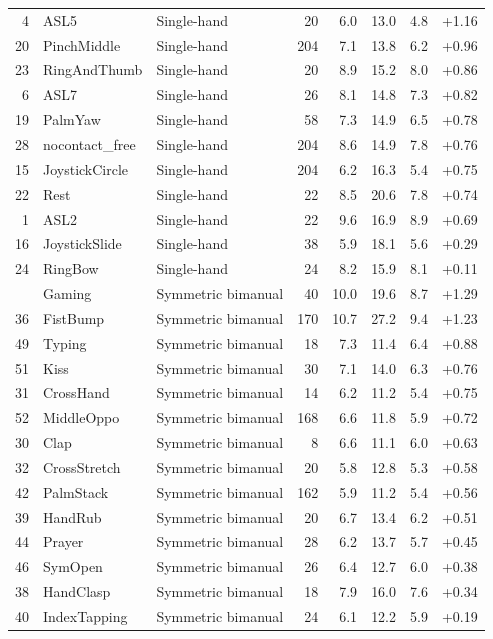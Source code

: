 \begin{table}[h]
\begin{tabular}{rllrrrrr}
4 & ASL5 & Single-hand & 20 & 6.0 & 13.0 & 4.8 & +1.16 \\
20 & PinchMiddle & Single-hand & 204 & 7.1 & 13.8 & 6.2 & +0.96 \\
23 & RingAndThumb & Single-hand & 20 & 8.9 & 15.2 & 8.0 & +0.86 \\
6 & ASL7 & Single-hand & 26 & 8.1 & 14.8 & 7.3 & +0.82 \\
19 & PalmYaw & Single-hand & 58 & 7.3 & 14.9 & 6.5 & +0.78 \\
28 & nocontact\_free & Single-hand & 204 & 8.6 & 14.9 & 7.8 & +0.76 \\
15 & JoystickCircle & Single-hand & 204 & 6.2 & 16.3 & 5.4 & +0.75 \\
22 & Rest & Single-hand & 22 & 8.5 & 20.6 & 7.8 & +0.74 \\
1 & ASL2 & Single-hand & 22 & 9.6 & 16.9 & 8.9 & +0.69 \\
16 & JoystickSlide & Single-hand & 38 & 5.9 & 18.1 & 5.6 & +0.29 \\
24 & RingBow & Single-hand & 24 & 8.2 & 15.9 & 8.1 & +0.11 \\
\addlinespace[3pt]
37 & Gaming & Symmetric bimanual & 40 & 10.0 & 19.6 & 8.7 & +1.29 \\
36 & FistBump & Symmetric bimanual & 170 & 10.7 & 27.2 & 9.4 & +1.23 \\
49 & Typing & Symmetric bimanual & 18 & 7.3 & 11.4 & 6.4 & +0.88 \\
51 & Kiss & Symmetric bimanual & 30 & 7.1 & 14.0 & 6.3 & +0.76 \\
31 & CrossHand & Symmetric bimanual & 14 & 6.2 & 11.2 & 5.4 & +0.75 \\
52 & MiddleOppo & Symmetric bimanual & 168 & 6.6 & 11.8 & 5.9 & +0.72 \\
30 & Clap & Symmetric bimanual & 8 & 6.6 & 11.1 & 6.0 & +0.63 \\
32 & CrossStretch & Symmetric bimanual & 20 & 5.8 & 12.8 & 5.3 & +0.58 \\
42 & PalmStack & Symmetric bimanual & 162 & 5.9 & 11.2 & 5.4 & +0.56 \\
39 & HandRub & Symmetric bimanual & 20 & 6.7 & 13.4 & 6.2 & +0.51 \\
44 & Prayer & Symmetric bimanual & 28 & 6.2 & 13.7 & 5.7 & +0.45 \\
46 & SymOpen & Symmetric bimanual & 26 & 6.4 & 12.7 & 6.0 & +0.38 \\
38 & HandClasp & Symmetric bimanual & 18 & 7.9 & 16.0 & 7.6 & +0.34 \\
40 & IndexTapping & Symmetric bimanual & 24 & 6.1 & 12.2 & 5.9 & +0.19 \\

\end{tabular}
\end{table}
